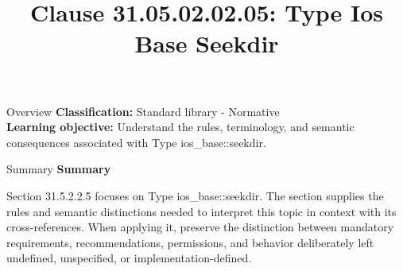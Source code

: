 \documentclass[10pt,letterpaper]{article}
\title{Clause 31.05.02.02.05: Type Ios Base Seekdir}
\author{}
\date{}
\begin{document}
\maketitle
\begin{CornellOverviewBox}{Overview}
\textbf{Classification:} Standard library - Normative\\[2pt]
\textbf{Learning objective:} Understand the rules, terminology, and semantic consequences associated with Type ios\_base::seekdir.
\end{CornellOverviewBox}\begin{CornellSummaryBox}{Summary}
{\sffamily\bfseries\color{Accent} Summary}\par\vspace{3pt}Section 31.5.2.2.5 focuses on Type ios\_base::seekdir. The section supplies the rules and semantic distinctions needed to interpret this topic in context with its cross-references. When applying it, preserve the distinction between mandatory requirements, recommendations, permissions, and behavior deliberately left undefined, unspecified, or implementation-defined.
\end{CornellSummaryBox}
\end{document}

